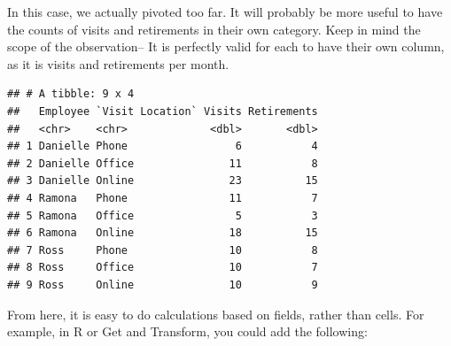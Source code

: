 \documentclass[]{book}
\newenvironment{Shaded}{\begin{snugshade}}{\end{snugshade}}
\newcommand{\DataTypeTok}[1]{\textcolor[rgb]{0.13,0.29,0.53}{#1}}
\newcommand{\KeywordTok}[1]{\textcolor[rgb]{0.13,0.29,0.53}{\textbf{#1}}}
\newcommand{\NormalTok}[1]{#1}
\newcommand{\OperatorTok}[1]{\textcolor[rgb]{0.81,0.36,0.00}{\textbf{#1}}}
\newcommand{\StringTok}[1]{\textcolor[rgb]{0.31,0.60,0.02}{#1}}
\begin{document}
In this case, we actually pivoted too far. It will probably be more useful to have the counts of visits and retirements in their own category. Keep in mind the scope of the observation-- It is perfectly valid for each to have their own column, as it is visits and retirements per month.

\begin{Shaded}
\end{Shaded}

\begin{verbatim}
## # A tibble: 9 x 4
##   Employee `Visit Location` Visits Retirements
##   <chr>    <chr>             <dbl>       <dbl>
## 1 Danielle Phone                 6           4
## 2 Danielle Office               11           8
## 3 Danielle Online               23          15
## 4 Ramona   Phone                11           7
## 5 Ramona   Office                5           3
## 6 Ramona   Online               18          15
## 7 Ross     Phone                10           8
## 8 Ross     Office               10           7
## 9 Ross     Online               10           9
\end{verbatim}

From here, it is easy to do calculations based on fields, rather than cells. For example, in R or Get and Transform, you could add the following:

\begin{Shaded}
\end{Shaded}
\end{document}
